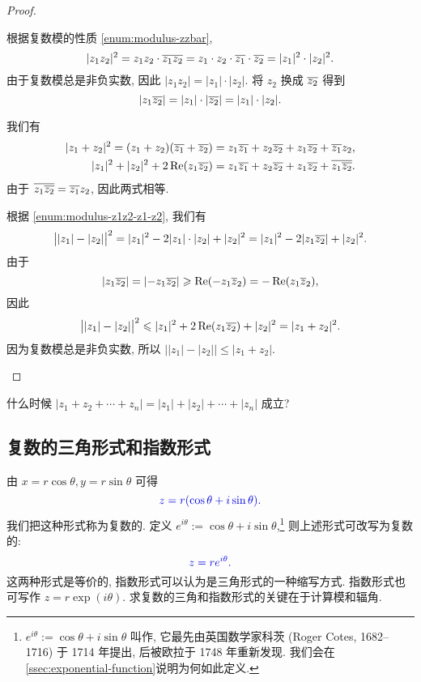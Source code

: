 \begin{proof}\delspace
  \begin{enumnopar}[(i)]
    \item 根据复数模的性质  \ref{enum:modulus-zzbar},
    \[|z_1z_2|^2=z_1z_2\cdot\overline{z_1}\overline{z_2}
    =z_1\cdot z_2\cdot \overline{z_1}\cdot \overline{z_2}=|z_1|^2\cdot|z_2|^2.\]
    由于复数模总是非负实数, 因此 $|z_1z_2|=|z_1|\cdot|z_2|$.
    将 $z_2$ 换成 $\overline{z_2}$ 得到
    \[|z_1\overline{z_2}|=|z_1|\cdot|\overline{z_2}|=|z_1|\cdot|z_2|.\]
    \item 我们有
    \begin{align*}
        |z_1+z_2|^2
       =(z_1+z_2)(\overline{z_1}+\overline{z_2})
      &=z_1\overline{z_1}+z_2\overline{z_2}+z_1\overline{z_2}+\overline{z_1}z_2,\\
        |z_1|^2+|z_2|^2+2\operatorname{Re}(z_1\overline{z_2})
      &=z_1\overline{z_1}+z_2\overline{z_2}+z_1\overline{z_2}+\overline{z_1\overline{z_2}}.
    \end{align*}
    由于 $\overline{z_1\overline{z_2}}=\overline{z_1}z_2$, 因此两式相等.
    \item 根据  \ref{enum:modulus-z1z2-z1-z2}, 我们有
      \[\bigl||z_1|-|z_2|\bigr|^2=|z_1|^2-2|z_1|\cdot|z_2|+|z_2|^2=|z_1|^2-2|z_1 \overline{z_2}|+|z_2|^2.\]
      由于
      \[|z_1\overline{z_2}|=|{-z_1\overline{z_2}}|\geqslant\operatorname{Re}(-z_1\overline z_2)=-\operatorname{Re}(z_1\overline z_2),\]
      因此
      \[\bigl||z_1|-|z_2|\bigr|^2\leqslant |z_1|^2+2\operatorname{Re}(z_1 \overline{z_2})+|z_2|^2=|z_1+z_2|^2.\]
      因为复数模总是非负实数, 所以 $\bigl||z_1|-|z_2|\bigr|\le|z_1+z_2|$.
  \end{enumnopar}
\end{proof}

\begin{exercise}
  什么时候 $|z_1+z_2+\cdots+z_n|=|z_1|+|z_2|+\cdots+|z_n|$ 成立?
\end{exercise}



\subsection{复数的三角形式和指数形式}

由 $x=r\cos\theta,y=r\sin\theta$ 可得
\[
  \color{main}z=r(\cos\theta+i\sin\theta).
\]
我们把这种形式称为复数的.
定义 \alert{$e^{i\theta}:=\cos\theta+i\sin\theta$},\footnote{%
  $e^{i\theta}:=\cos\theta+i\sin\theta$ 叫作, 它最先由英国数学家科茨 (Roger Cotes, 1682--1716) 于 1714 年提出\cite{Cotes1714}, 后被欧拉于 1748 年重新发现.
  我们会在 \ref{ssec:exponential-function}说明为何如此定义.
}
则上述形式可改写为复数的:
\[
  \color{main}z=re^{i\theta}.
\]
这两种形式是等价的, 指数形式可以认为是三角形式的一种缩写方式.
指数形式也可写作 $z=r\exp(i\theta)$.
求复数的三角和指数形式的\alert{关键在于计算模和辐角}.

